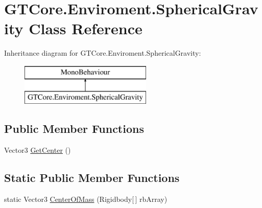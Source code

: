 \hypertarget{class_g_t_core_1_1_enviroment_1_1_spherical_gravity}{}\section{G\+T\+Core.\+Enviroment.\+Spherical\+Gravity Class Reference}
\label{class_g_t_core_1_1_enviroment_1_1_spherical_gravity}
Inheritance diagram for G\+T\+Core.\+Enviroment.\+Spherical\+Gravity\+:\begin{figure}[H]
\begin{center}
\leavevmode
\includegraphics[height=2.000000cm]{class_g_t_core_1_1_enviroment_1_1_spherical_gravity}
\end{center}
\end{figure}
\subsection*{Public Member Functions}
\begin{DoxyCompactItemize}
\item 
Vector3 \hyperlink{class_g_t_core_1_1_enviroment_1_1_spherical_gravity_a62e4d93af1761d1303d77defa5efb849}{Get\+Center} ()
\end{DoxyCompactItemize}
\subsection*{Static Public Member Functions}
\begin{DoxyCompactItemize}
\item 
static Vector3 \hyperlink{class_g_t_core_1_1_enviroment_1_1_spherical_gravity_a4eb4a5a2cd4dff163e5ab18b787fa5a2}{Center\+Of\+Mass} (Rigidbody\mbox{[}$\,$\mbox{]} rb\+Array)
\end{DoxyCompactItemize}
